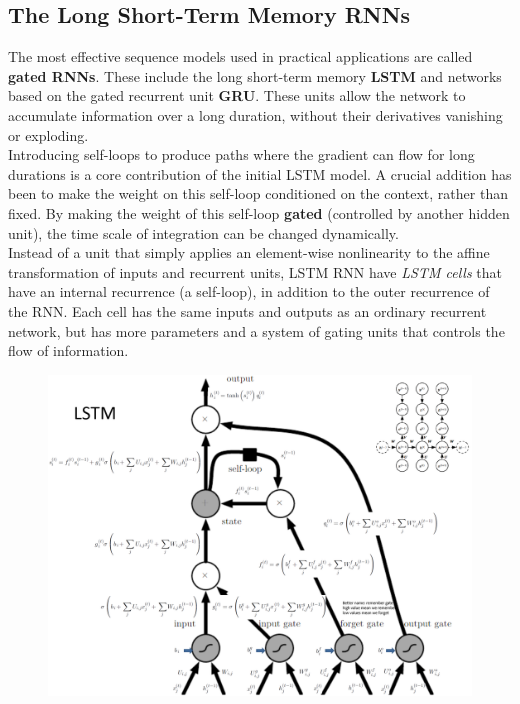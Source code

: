 \begin{multicols}{2}
	\subsection{The Long Short-Term Memory RNNs}
	The most effective sequence models used in practical applications are called \textbf{gated RNNs}.
	These include the long short-term memory \textbf{LSTM} and networks based on the gated recurrent unit \textbf{GRU}.
	These units allow the network to accumulate information over a long duration, without their derivatives vanishing or exploding.\\

	Introducing self-loops to produce paths where the gradient can flow for long durations is a core contribution of the initial LSTM model.
	A crucial addition has been to make the weight on this self-loop conditioned on the context, rather than fixed.
	By making the weight of this self-loop \textbf{gated} (controlled by another hidden unit), the time scale of integration can be changed dynamically.\\

	Instead of a unit that simply applies an element-wise nonlinearity to the affine transformation of inputs and recurrent units, LSTM RNN have \emph{LSTM cells} that have an internal recurrence (a self-loop), in addition to the outer recurrence of the RNN.
	Each cell has the same inputs and outputs as an ordinary recurrent network, but has more parameters and a system of gating units that controls the flow of information.
\end{multicols}
\begin{figure}[H]
	\centering
	\includegraphics[width=\linewidth]{images/lstm.PNG}
\end{figure}
